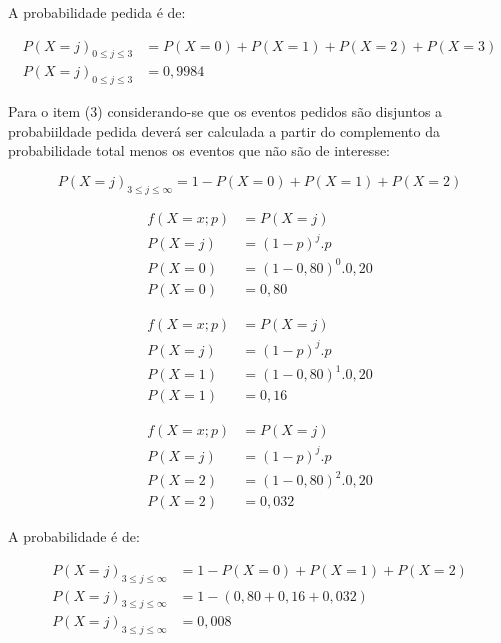 \documentclass[
]{book}
\begin{document}
\hfill\break

A probabilidade pedida é de:

\begin{align*}
P(X=j)_{0 \leq j \leq 3} & = P(X=0) + P(X=1) + P(X=2) + P(X=3) \\
P(X=j)_{0 \leq j \leq 3} & =  0,9984
\end{align*}

\hfill\break

Para o item (3) considerando-se que os eventos pedidos são disjuntos a probabiildade pedida deverá ser calculada a partir do complemento da probabilidade total menos os eventos que não são de interesse:

\hfill\break

\[
P(X=j)_{3 \leq j \leq \infty} = 1 - P(X=0) + P(X=1) + P(X=2)
\]

\hfill\break

\begin{align*}
f(X=x; p) & =  P(X=j) \\
P(X=j) & = (1-p)^{j} . p \\
P(X=0) & = (1-0,80)^{0} . 0,20 \\
P(X=0) & =  0,80 
\end{align*}

\hfill\break

\begin{align*}
f(X=x; p) & =  P(X=j) \\
P(X=j) & =  (1-p)^{j} . p \\
P(X=1) & =  (1-0,80)^{1} . 0,20 \\
P(X=1) & =  0,16
\end{align*}

\hfill\break

\begin{align*}
f(X=x; p) & =   P(X=j) \\
P(X=j) & =  (1-p)^{j} . p \\
P(X=2) & =  (1-0,80)^{2} . 0,20 \\
P(X=2) & =  0,032
\end{align*}

\hfill\break

A probabilidade é de:

\begin{align*}
P(X=j)_{3 \leq j \leq \infty} &  =  1 - P(X=0) + P(X=1) + P(X=2) \\
P(X=j)_{3 \leq j \leq \infty} &  = 1 - (0,80 + 0,16 + 0,032) \\
P(X=j)_{3 \leq j \leq \infty} &  = 0,008
\end{align*}
\end{document}
